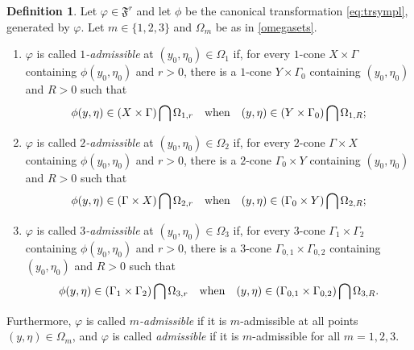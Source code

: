 \documentclass[12pt,a4paper,reqno]{amsart}
\numberwithin{equation}{section}
\numberwithin{thm}{section}
\theoremstyle{definition}
\newtheorem{defn}[thm]{Definition}
\theoremstyle{remark}
\begin{document}
\begin{defn}\label{def:gadm}
Let $\varphi\in{\mathfrak{F}^r}$ and let $\phi$ be the canonical transformation
\eqref{eq:trsympl}, generated by $\varphi$. Let $m\in \{1,2,3\}$ and
$\Omega _m$ be as in \eqref{omegasets}.
\begin{enumerate}
		\item $\varphi$ is called \emph{$1$-admissible} at $(y_0,\eta_0) \in
	\Omega _1$ if, for every $1$-cone $X\times \Gamma$ containing
	$\phi (y_0,\eta_0)$ and $r>0$, there is a $1$-cone $Y\times \Gamma _0$
	containing $(y_0,\eta _0)$ and $R>0$ such that
	         	         \begin{equation*}
	         \phi (y,\eta ) \in (X\times \Gamma)\bigcap \Omega _{1,r}
	         \quad \text{when}\quad
	         (y,\eta ) \in (Y\times \Gamma _0)\bigcap \Omega _{1,R}\text ;
	         \end{equation*}
 	         
{\vspace{0.1cm}}

	\item $\varphi$ is called \emph{$2$-admissible} at $(y_0,\eta_0) \in
	\Omega _2$ if, for every $2$-cone $\Gamma \times X$ containing
	$\phi (y_0,\eta_0)$ and $r>0$, there is a $2$-cone $\Gamma _0\times Y$
	containing $(y_0,\eta _0)$ and $R>0$ such that
	         	         \begin{equation*}
	         \phi (y,\eta ) \in (\Gamma \times X)\bigcap \Omega _{2,r}
	         \quad \text{when}\quad
	         (y,\eta ) \in (\Gamma _0\times Y)\bigcap \Omega _{2,R}\text ;
	         \end{equation*}
	         
{\vspace{0.1cm}}
	         
	\item $\varphi$ is called \emph{$3$-admissible} at $(y_0,\eta_0) \in
		\Omega _3$ if, for every $3$-cone $\Gamma _1\times \Gamma _2$
		containing $\phi (y_0,\eta_0)$ and $r>0$, there is a $3$-cone
		$\Gamma _{0,1}\times \Gamma _{0,2}$
		containing $(y_0,\eta _0)$ and $R>0$ such that
	         	         \begin{equation*}
	         \phi (y,\eta ) \in (\Gamma _1\times \Gamma _2)
	         \bigcap \Omega _{3,r}
	         \quad \text{when}\quad
	         (y,\eta ) \in (\Gamma _{0,1}\times \Gamma _{0,2})\bigcap
	         \Omega _{3,R}\text .
	         \end{equation*}
\end{enumerate} 

\par

Furthermore, $\varphi$ is called \emph{$m$-admissible} if it is $m$-admissible
at all points $(y,\eta )\in \Omega _m$, and 
$\varphi$ is called \emph{admissible} if it is $m$-admissible for all $m=1,2,3$.
\end{defn} 
\end{document}
